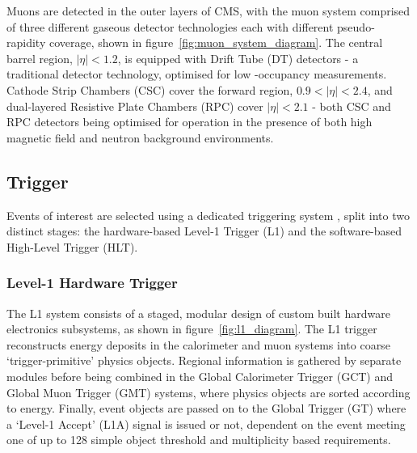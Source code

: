 Muons are detected in the outer layers of CMS, with the muon system 
comprised of three different gaseous detector technologies each with different 
pseudo-rapidity coverage, shown in figure~\ref{fig:muon_system_diagram}. The
central barrel region, $|\eta|<1.2$, is equipped with 
Drift Tube (DT) detectors - a traditional detector technology, optimised for low
-occupancy measurements. Cathode Strip Chambers (CSC) cover the forward region,
$0.9 < |\eta| < 2.4$, and dual-layered Resistive Plate Chambers (RPC) cover
$|\eta| < 2.1$ - both CSC and RPC detectors being optimised for operation in 
the presence of both high magnetic field and neutron background environments.


\subsection{Trigger}
\label{sec:detector_trigger}
Events of interest are selected using a dedicated triggering system \cite{tridasTDR},
split into two distinct stages: the hardware-based Level-1 Trigger (L1) and
the software-based High-Level Trigger (HLT).

\subsubsection{Level-1 Hardware Trigger}

The L1 system consists of a staged, modular design of custom built hardware 
electronics subsystems, as shown in figure~\ref{fig:l1_diagram}. 
The L1 trigger reconstructs energy deposits in the calorimeter and muon systems
into coarse `trigger-primitive' physics objects.
Regional information is gathered by separate modules 
before being combined in the Global Calorimeter Trigger (GCT) and Global Muon 
Trigger (GMT) systems, where physics objects are sorted according to energy. 
Finally, event objects are passed on to the Global Trigger (GT) where a 
`Level-1 Accept' (L1A) signal is issued or not, dependent on the event meeting 
one of up to 128 simple object threshold and multiplicity based requirements.

